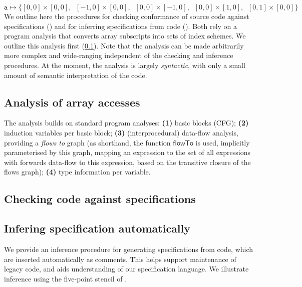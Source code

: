 \begin{equation*}
\texttt{a} \mapsto \{[0,0]\times[0,0], \;\; [-1,0]\times[0,0], \;\;
[0,0]\times[-1,0], \;\; [0,0]\times[1,0], \;\; [0,1]\times[0,0]\}
\end{equation*}
%
We outline here the procedures for checking conformance
of source code against specifications ()
and for inferring specifications from code ().
Both rely on a program analysis that converts array subscripts
 into sets of index schemes. We outline this analysis
first (\cref{subsec:analysis}). Note that the analysis
can be made arbitrarily more complex and wide-ranging independent
of the checking and inference procedures. At the moment, the analysis
is largely \emph{syntactic}, with only a small amount of
semantic interpretation of the code.

\subsection{Analysis of array accesses}
\label{subsec:analysis}

\newcommand{\neigh}{\textsf{neigh}}

The analysis builds on standard program analyses:
%
\textbf{(1)} basic blocks (CFG);
\textbf{(2)} induction variables per basic block;
\textbf{(3)} (interprocedural) data-flow analysis, providing a \emph{flows to}
  graph (as shorthand, the function
  $\mathsf{flowTo}$ is used, implicitly parameterised by this graph,
  mapping an expression to the set of all expressions
  with forwards data-flow to this expression, based on the transitive
  closure of the flows graph);
\textbf{(4)} type information per variable.%


\subsection{Checking code against specifications}
\label{subsec:checking}

\subsection{Infering specification automatically}
\label{subsec:inference}

We provide an inference procedure for generating specifications from
code, which are inserted automatically as comments. This helps support
maintenance of legacy code, and aids understanding of our
specification language. We illustrate inference using the
five-point stencil of .

